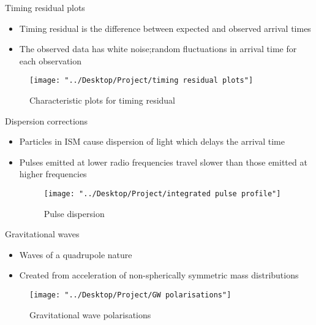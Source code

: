 \documentclass{beamer}
\begin{document}
\begin{frame}{Timing residual plots}
\begin{itemize}
	\item Timing residual is the difference between expected and observed arrival times
	\item The observed data has white noise;random fluctuations in arrival time for each observation
\end{itemize}
\begin{figure}
	\centering
	\texttt{[image: "../Desktop/Project/timing residual plots"]}
	\caption{Characteristic plots for timing residual}
	\label{fig:timing-residual-plots}
\end{figure}
\end{frame}
\begin{frame}{Dispersion corrections}
\begin{itemize}
\item Particles in ISM cause dispersion of light which delays the arrival time
\item  Pulses emitted at lower radio frequencies travel slower than those emitted at higher frequencies
\begin{figure}
	\centering
	\texttt{[image: "../Desktop/Project/integrated pulse profile"]}
	\caption{Pulse dispersion}
	\label{fig:integrated-pulse-profile}
\end{figure}
\end{itemize}
\end{frame}

\begin{frame}{Gravitational waves}
\begin{itemize}
	\item Waves of a quadrupole nature 
	\item Created from acceleration of non-spherically symmetric mass distributions 
\end{itemize}
\begin{figure}
	\centering
	\texttt{[image: "../Desktop/Project/GW polarisations"]}
	\caption{Gravitational wave polarisations}
	\label{fig:gw-polarisations}
\end{figure}
\end{frame}
\end{document}
